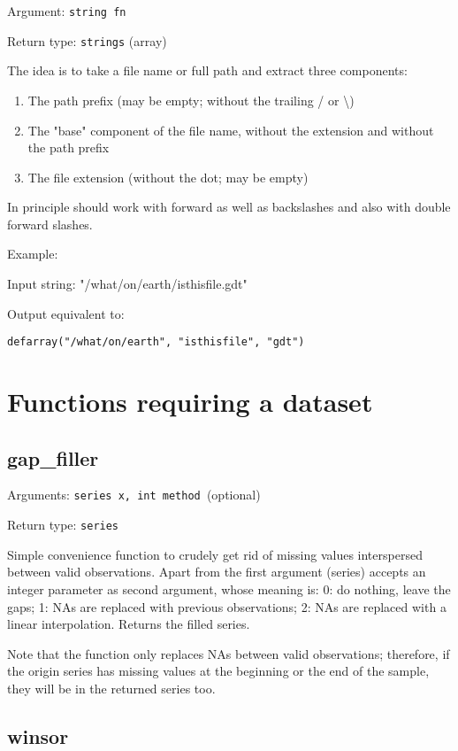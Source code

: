 \documentclass[11pt,english]{article}
\begin{document}
Argument: \texttt{string fn}

\noindent Return type: \texttt{strings} (array)

The idea is to take a file name or full path and extract three components:
\begin{enumerate}
\item The path prefix (may be empty; without the trailing / or \textbackslash)
\item The "base" component of the file name, without the extension and without the path prefix 
\item The file extension (without the dot; may be empty)
\end{enumerate}	
In principle should work with forward as well as backslashes and also with double forward slashes.

Example:

Input string: "/what/on/earth/isthisfile.gdt"

Output equivalent to: 

\texttt{defarray("/what/on/earth", "isthisfile", "gdt")}


\section{Functions requiring a dataset}

\subsection{gap\_filler}

Arguments: \texttt{series x, int method }(optional)\texttt{ }

\noindent Return type: \texttt{series}

Simple convenience function to crudely get rid of missing values
interspersed between valid observations. Apart from the first argument
(series) accepts an integer parameter as second argument, whose
meaning is: 0: do nothing, leave the gaps; 1: NAs are replaced with
previous observations; 2: NAs are replaced with a linear
interpolation. Returns the filled series.

Note that the function only replaces NAs between valid observations;
therefore, if the origin series has missing values at the beginning or
the end of the sample, they will be in the returned series too.

\subsection{winsor}
\end{document}
